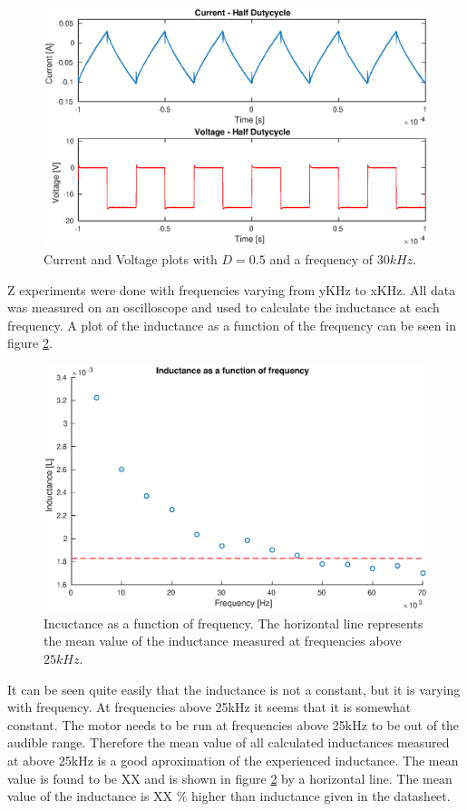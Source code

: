 \begin{figure}[!h]
	\centering
	\includegraphics[width=.75\linewidth]{graphics/half_duty}
	\caption{Current and Voltage plots with $D = 0.5$ and a frequency of $30kHz$.}
	\label{fig:half_duty}
\end{figure}

Z experiments were done with frequencies varying from yKHz to xKHz.
All data was measured on an oscilloscope and used to calculate the inductance at each frequency.
A plot of the inductance as a function of the frequency can be seen in figure \ref{fig:inductance_freq}.

\begin{figure}[!h]
	\centering
	\includegraphics[width=.75\linewidth]{graphics/l_freq}
	\caption{Incuctance as a function of frequency. The horizontal line represents the mean value of the inductance measured at frequencies above $25kHz$.}
	\label{fig:inductance_freq}
\end{figure}

It can be seen quite easily that the inductance is not a constant, but it is varying with frequency. 
At frequencies above 25kHz it seems that it is somewhat constant. 
The  motor needs to be run at frequencies above 25kHz to be out of the audible range. 
Therefore the mean value of all calculated inductances measured at above 25kHz is a good aproximation of the experienced inductance.
The mean value is found to be XX and is shown in figure \ref{fig:inductance_freq} by a horizontal line.
The mean value of the inductance is XX $\%$ higher than inductance given in the datasheet.	

